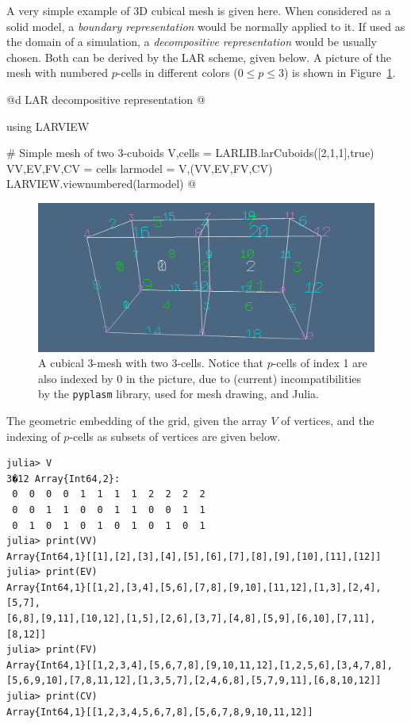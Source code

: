 \begin{example}
\label{ex:boundary1}


A very simple example of 3D cubical mesh is given here. When considered as a solid model,  a \emph{boundary representation} would be normally applied to it. If used as the domain of a simulation, a \emph{decompositive representation} would be usually chosen. Both can be derived by the LAR scheme, given below. A picture of the mesh with numbered $p$-cells in different colors ($0\leq p\leq 3$) is shown in Figure~\ref{fig:intro-1}.

@d LAR decompositive representation 
@{using LARVIEW

# Simple mesh of two 3-cuboids
V,cells = LARLIB.larCuboids([2,1,1],true)
VV,EV,FV,CV = cells
larmodel = V,(VV,EV,FV,CV)
LARVIEW.viewnumbered(larmodel)
@}

\begin{figure}[htbp] %
   \centering
   \includegraphics[width=\textwidth]{img/intro-1.pdf} 
   \caption{A cubical 3-mesh with two 3-cells. Notice that $p$-cells of index 1 are also indexed by 0 in the picture, due to (current) incompatibilities by the \texttt{pyplasm} library, used for mesh drawing, and Julia.}
   \label{fig:intro-1}
\end{figure}

The geometric embedding of the grid, given the array $V$ of vertices, and the indexing of $p$-cells as subsets of vertices are given below.

{\small\begin{verbatim}
julia> V
3�12 Array{Int64,2}:
 0  0  0  0  1  1  1  1  2  2  2  2
 0  0  1  1  0  0  1  1  0  0  1  1
 0  1  0  1  0  1  0  1  0  1  0  1
julia> print(VV)
Array{Int64,1}[[1],[2],[3],[4],[5],[6],[7],[8],[9],[10],[11],[12]]
julia> print(EV)
Array{Int64,1}[[1,2],[3,4],[5,6],[7,8],[9,10],[11,12],[1,3],[2,4],[5,7],
[6,8],[9,11],[10,12],[1,5],[2,6],[3,7],[4,8],[5,9],[6,10],[7,11],[8,12]]
julia> print(FV)
Array{Int64,1}[[1,2,3,4],[5,6,7,8],[9,10,11,12],[1,2,5,6],[3,4,7,8],
[5,6,9,10],[7,8,11,12],[1,3,5,7],[2,4,6,8],[5,7,9,11],[6,8,10,12]]
julia> print(CV)
Array{Int64,1}[[1,2,3,4,5,6,7,8],[5,6,7,8,9,10,11,12]]
\end{verbatim}
}
\end{example}


